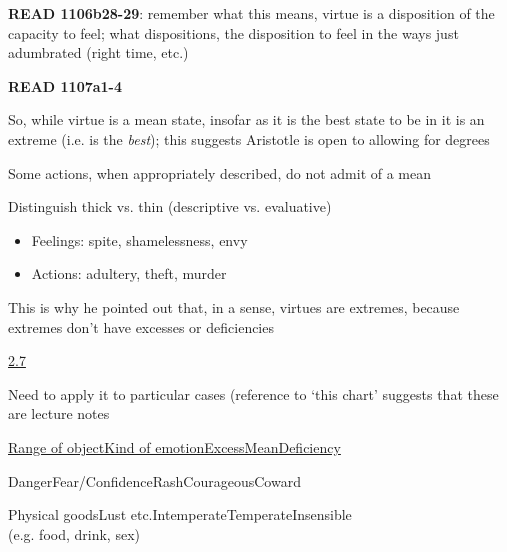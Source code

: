 \documentclass[11pt]{article}
\begin{document}
\noindent\textbf{READ 1106b28-29}: remember what this means, virtue is a disposition of the capacity to feel; what dispositions, the disposition to feel in the ways just adumbrated (right time, etc.)
\vspace*{2mm}

\noindent\textbf{READ 1107a1-4}
\vspace*{2mm}

\noindent So, while virtue is a mean state, insofar as it is the best state to be in it is an extreme (i.e. is the \emph{best}); this suggests Aristotle is open to allowing for degrees
\vspace*{2mm}

\noindent Some actions, when appropriately described, do not admit of a mean
\vspace*{2mm}

\noindent Distinguish thick vs. thin (descriptive vs. evaluative)

\begin{itemize}\item{Feelings: spite, shamelessness, envy}\item{Actions: adultery, theft, murder}\end{itemize}

\noindent This is why he pointed out that, in a sense, virtues are extremes, because extremes don't have excesses or deficiencies
\vspace*{4mm}

\noindent\underline{2.7}
\vspace*{2mm}

\noindent Need to apply it to particular cases (reference to `this chart' suggests that these are lecture notes
\vspace*{2mm}

\noindent\underline{Range of object\hspace*{10mm}Kind of emotion\hspace*{10mm}Excess\hspace*{17mm}Mean\hspace*{18mm}Deficiency}
\vspace*{1mm}

\noindent Danger\hspace*{22mm}Fear/Confidence\hspace*{10mm}Rash\hspace*{16mm}Courageous\hspace*{12mm}Coward
\vspace*{1mm}

\noindent Physical goods\hspace*{11mm}Lust etc.\hspace*{20mm}Intemperate\hspace*{8mm}Temperate\hspace*{13mm}Insensible\\\hspace*{2mm}(e.g. food, drink, sex)
\vspace*{1mm}
\end{document}
